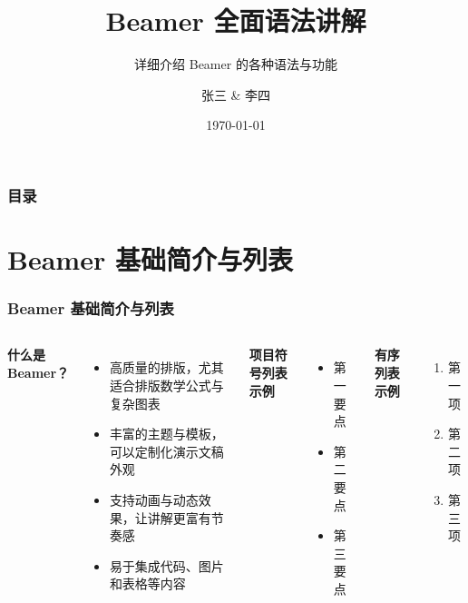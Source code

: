 \documentclass[10pt,aspectratio=169,mathserif]{beamer}
\title{Beamer 全面语法讲解}         %
\subtitle{详细介绍 Beamer 的各种语法与功能} %
\author{张三 \& 李四}               %
\institute{某某大学 \\ 某某研究所}    %
\date{\today}                   %
\begin{document}
\begin{frame}
    \titlepage  
\end{frame}

\begin{frame}
    \frametitle{目录}
    \tableofcontents
\end{frame}

\section{Beamer 基础简介与列表}
\begin{frame}
    \frametitle{Beamer 基础简介与列表}
    \begin{columns}[T] %
        \textbf{什么是 Beamer？}
        \begin{itemize}
            \item 高质量的排版，尤其适合排版数学公式与复杂图表
            \item 丰富的主题与模板，可以定制化演示文稿外观
            \item 支持动画与动态效果，让讲解更富有节奏感
            \item 易于集成代码、图片和表格等内容
        \end{itemize}

        \textbf{项目符号列表示例}
        \begin{itemize}
            \item 第一要点
            \item 第二要点
            \item 第三要点
        \end{itemize}
        
        \textbf{有序列表示例}
        \begin{enumerate}
            \item 第一项
            \item 第二项
            \item 第三项
        \end{enumerate}
    \end{columns}
\end{frame}
\end{document}
